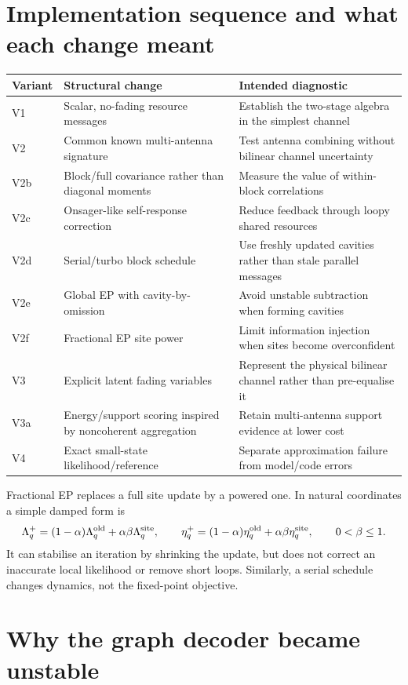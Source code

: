 \documentclass[11pt]{article}
\begin{document}
\section{Implementation sequence and what each change meant}

\begin{tabularx}{\textwidth}{@{}lYY@{}}
\toprule
Variant & Structural change & Intended diagnostic \\
\midrule
V1 & Scalar, no-fading resource messages & Establish the two-stage algebra in the simplest channel \\
V2 & Common known multi-antenna signature & Test antenna combining without bilinear channel uncertainty \\
V2b & Block/full covariance rather than diagonal moments & Measure the value of within-block correlations \\
V2c & Onsager-like self-response correction & Reduce feedback through loopy shared resources \\
V2d & Serial/turbo block schedule & Use freshly updated cavities rather than stale parallel messages \\
V2e & Global EP with cavity-by-omission & Avoid unstable subtraction when forming cavities \\
V2f & Fractional EP site power & Limit information injection when sites become overconfident \\
V3 & Explicit latent fading variables & Represent the physical bilinear channel rather than pre-equalise it \\
V3a & Energy/support scoring inspired by noncoherent aggregation & Retain multi-antenna support evidence at lower cost \\
V4 & Exact small-state likelihood/reference & Separate approximation failure from model/code errors \\
\bottomrule
\end{tabularx}

Fractional EP replaces a full site update by a powered one. In natural coordinates a simple damped form is
\[
 \Lambda_q^+ = (1-\alpha)\Lambda_q^{\rm old}+\alpha\beta\Lambda_q^{\rm site},
 \qquad
 \eta_q^+ = (1-\alpha)\eta_q^{\rm old}+\alpha\beta\eta_q^{\rm site},
 \qquad 0<\beta\le1.
\]
It can stabilise an iteration by shrinking the update, but does not correct an inaccurate local likelihood or remove
short loops. Similarly, a serial schedule changes dynamics, not the fixed-point objective.

\section{Why the graph decoder became unstable}
\end{document}
